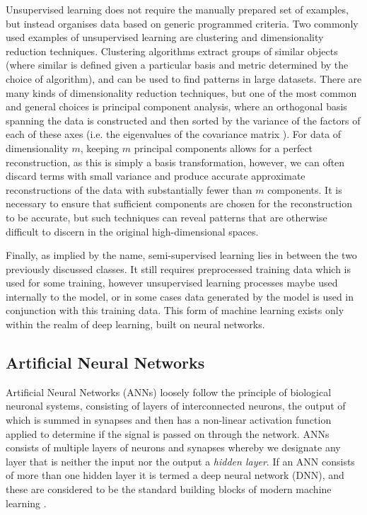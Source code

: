 Unsupervised learning does not require the manually prepared set of examples, but instead organises data based on generic programmed criteria.
Two commonly used examples of unsupervised learning are clustering and dimensionality reduction techniques.
Clustering algorithms extract groups of similar objects (where similar is defined given a particular basis and metric determined by the choice of algorithm), and can be used to find patterns in large datasets.
There are many kinds of dimensionality reduction techniques, but one of the most common and general choices is principal component analysis, where an orthogonal basis spanning the data is constructed and then sorted by the variance of the factors of each of these axes (i.e. the eigenvalues of the covariance matrix \NeedRef{}).
For data of dimensionality $m$, keeping $m$ principal components allows for a perfect reconstruction, as this is simply a basis transformation, however, we can often discard terms with small variance and produce accurate approximate reconstructions of the data with substantially fewer than $m$ components.
It is necessary to ensure that sufficient components are chosen for the reconstruction to be accurate, but such techniques can reveal patterns that are otherwise difficult to discern in the original high-dimensional spaces.

Finally, as implied by the name, semi-supervised learning lies in between the two previously discussed classes.
It still requires preprocessed training data which is used for some training, however unsupervised learning processes maybe used internally to the model, or in some cases data generated by the model is used in conjunction with this training data.
This form of machine learning exists only within the realm of deep learning, built on neural networks.

\subsection{Artificial Neural Networks}

Artificial Neural Networks (ANNs) loosely follow the principle of biological neuronal systems, consisting of layers of interconnected neurons, the output of which is summed in synapses and then has a non-linear activation function applied to determine if the signal is passed on through the network.
ANNs consists of multiple layers of neurons and synapses whereby we designate any layer that is neither the input nor the output a \emph{hidden layer}.
If an ANN consists of more than one hidden layer it is termed a deep neural network (DNN), and these are considered to be the standard building blocks of modern machine learning \citep{Raschka2015}.

